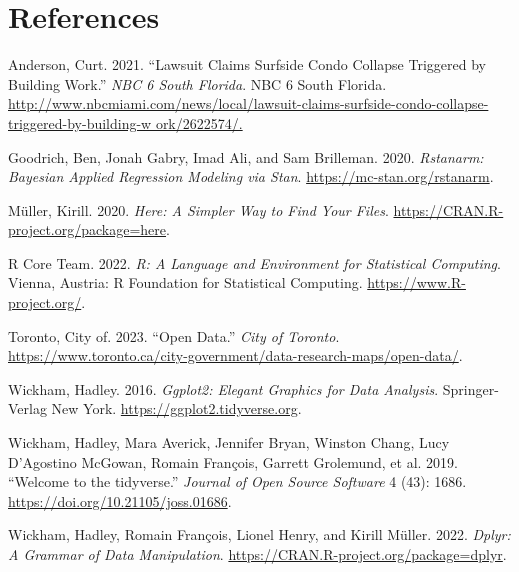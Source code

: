 \documentclass[
  letterpaper,
  DIV=11,
  numbers=noendperiod]{scrartcl}
\newlength{\cslhangindent}
\newlength{\cslentryspacingunit} %
\newenvironment{CSLReferences}[2] %
 {%
  \setlength{\parindent}{0pt}
  \ifodd #1
  \let\oldpar\par
  \def\par{\hangindent=\cslhangindent\oldpar}
  \fi
  \setlength{\parskip}{#2\cslentryspacingunit}
 }%
 {}
\begin{document}
\hypertarget{references}{%
\section*{References}\label{references}}

\hypertarget{refs}{}
\begin{CSLReferences}{1}{0}
\leavevmode{}%
Anderson, Curt. 2021. {``Lawsuit Claims Surfside Condo Collapse
Triggered by Building Work.''} \emph{NBC 6 South Florida}. NBC 6 South
Florida.
\href{http://www.nbcmiami.com/news/local/lawsuit-claims-surfside-condo-collapse-triggered-by-building-w\%20ork/2622574/.}{http://www.nbcmiami.com/news/local/lawsuit-claims-surfside-condo-collapse-triggered-by-building-w
ork/2622574/.}

\leavevmode{}%
Goodrich, Ben, Jonah Gabry, Imad Ali, and Sam Brilleman. 2020.
\emph{Rstanarm: Bayesian Applied Regression Modeling via Stan}.
\url{https://mc-stan.org/rstanarm}.

\leavevmode{}%
Müller, Kirill. 2020. \emph{Here: A Simpler Way to Find Your Files}.
\url{https://CRAN.R-project.org/package=here}.

\leavevmode{}%
R Core Team. 2022. \emph{R: A Language and Environment for Statistical
Computing}. Vienna, Austria: R Foundation for Statistical Computing.
\url{https://www.R-project.org/}.

\leavevmode{}%
Toronto, City of. 2023. {``Open Data.''} \emph{City of Toronto}.
\url{https://www.toronto.ca/city-government/data-research-maps/open-data/}.

\leavevmode{}%
Wickham, Hadley. 2016. \emph{Ggplot2: Elegant Graphics for Data
Analysis}. Springer-Verlag New York.
\url{https://ggplot2.tidyverse.org}.

\leavevmode{}%
Wickham, Hadley, Mara Averick, Jennifer Bryan, Winston Chang, Lucy
D'Agostino McGowan, Romain François, Garrett Grolemund, et al. 2019.
{``Welcome to the {tidyverse}.''} \emph{Journal of Open Source Software}
4 (43): 1686. \url{https://doi.org/10.21105/joss.01686}.

\leavevmode{}%
Wickham, Hadley, Romain François, Lionel Henry, and Kirill Müller. 2022.
\emph{Dplyr: A Grammar of Data Manipulation}.
\url{https://CRAN.R-project.org/package=dplyr}.


\end{CSLReferences}
\end{document}
